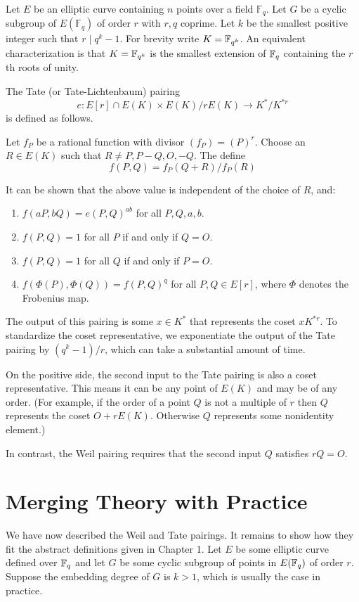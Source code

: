 Let $E$ be an elliptic curve containing $n$ points over a field $\mathbb{F}_q$.
Let $G$ be a cyclic subgroup of $E(\mathbb{F}_q)$ of order $r$ with $r, q$
coprime. Let $k$ be the smallest positive integer such that $r \mid q^k - 1$.
For brevity write $K = \mathbb{F}_{q^k}$.
An equivalent characterization is that
$K = \mathbb{F}_{q^k}$ is the smallest extension of $\mathbb{F}_q$ containing the $r$th roots of unity.

The Tate (or Tate-Lichtenbaum) pairing
\[
e : E[r] \cap E(K) \times
E(K) / r E(K) \rightarrow
K^* / K^{*r}
\]
is defined as follows.

Let $f_P$ be a rational function with divisor $(f_P) = (P)^r$.
Choose an $R\in E(K)$ such that $R \ne P, P-Q, O, -Q$. The define
\[
f(P, Q) = f_P (Q + R) / f_P (R)
\]

It can be shown that the above value is independent of the choice of $R$,
and:
\begin{enumerate}
\item
$f(a P, b Q) = e(P, Q)^{a b}$ for all $P, Q, a, b$.
\item
$f(P,Q) = 1$ for all $P$ if and only if $Q = O$.
\item
$f(P,Q) = 1$ for all $Q$ if and only if $P = O$.
\item
$f(\Phi(P),\Phi(Q)) = f(P,Q)^{q}$ for all $P,Q \in E[r]$,
where $\Phi$ denotes the Frobenius map.
\end{enumerate}

The output of this pairing is some $x \in K^*$
that represents the coset $x K^{*r}$. To standardize the coset
representative, we exponentiate the output of the Tate pairing
by $(q^k - 1) / r$, which can take a substantial amount of time.

On the positive side, the second input to the Tate pairing is also a coset
representative. This means it can be any point of $E(K)$ and may
be of any order. (For example,
if the order of a point $Q$ is not a multiple of $r$ then $Q$ represents
the coset $O + r E(K)$. Otherwise $Q$ represents some nonidentity
element.)

In contrast, the Weil pairing requires that the second
input $Q$ satisfies $r Q = O$.

\section {Merging Theory with Practice}

We have now described the Weil and Tate pairings. It remains to show
how they fit the abstract definitions given in Chapter 1.
Let $E$ be some elliptic curve defined over $\mathbb{F}_q$ and let $G$ be some
cyclic subgroup of points in $E(\mathbb{F}_q)$ of order $r$.
Suppose the embedding degree of $G$ is $k > 1$, which is usually the case
in practice.

